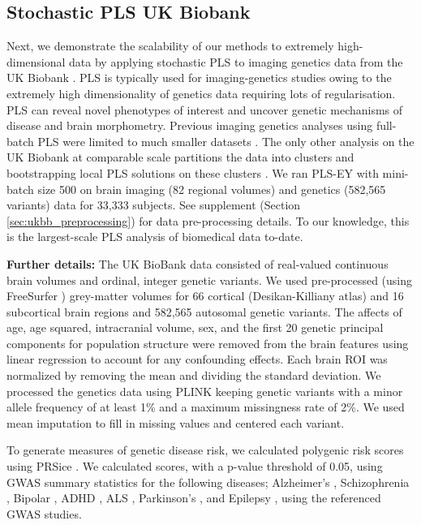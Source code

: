 \subsection{Stochastic PLS UK Biobank}
Next, we demonstrate the scalability of our methods to extremely high-dimensional data by applying stochastic PLS to imaging genetics data from the UK Biobank \citep{sudlow2015uk}.
PLS is typically used for imaging-genetics studies owing to the extremely high dimensionality of genetics data requiring lots of regularisation.
PLS can reveal novel phenotypes of interest and uncover genetic mechanisms of disease and brain morphometry.
Previous imaging genetics analyses using full-batch PLS were limited to much smaller datasets \citep{Lorenzi2018,Taquet2021,Lefloch2012}.
The only other analysis on the UK Biobank at comparable scale partitions the data into clusters and bootstrapping local PLS solutions on these clusters \citep{lorenzi2017secure, altmann2023tackling}.
We ran PLS-EY with mini-batch size 500 on brain imaging (82 regional volumes) and genetics (582,565 variants) data for 33,333 subjects. See supplement (Section \ref{sec:ukbb_preprocessing}) for data pre-processing details.
To our knowledge, this is the largest-scale PLS analysis of biomedical data to-date.

\textbf{Further details:} The UK BioBank data consisted of real-valued continuous brain volumes and ordinal, integer genetic variants. 
We used pre-processed (using FreeSurfer \citep{Fischl2012}) grey-matter volumes for 66 cortical (Desikan-Killiany atlas) and 16 subcortical brain regions and 582,565 autosomal genetic variants. 
The affects of age, age squared, intracranial volume, sex, and the first 20 genetic principal components for population structure were removed from the brain features using linear regression to account for any confounding effects. 
Each brain ROI was normalized by removing the mean and dividing the standard deviation. 
We processed the genetics data using PLINK \citep{Purcell2007} keeping genetic variants with a minor allele frequency of at least 1\%  and a maximum missingness rate of 2\%. 
We used mean imputation to fill in missing values and centered each variant. 

To generate measures of genetic disease risk, we calculated polygenic risk scores using PRSice \citep{PRSice2014}. We calculated scores, with a p-value threshold of 0.05, using GWAS summary statistics for the following diseases; Alzheimer's \citep{Lambert2013}, Schizophrenia \citep{Trubetskoy2022}, Bipolar \citep{Mullins2021}, ADHD \citep{Demontis2023}, ALS \citep{Van_Rheenen2021}, Parkinson's \citep{Nalls2019}, and Epilepsy \citep{International_League_Against_Epilepsy_Consortium_on_Complex_Epilepsies2018}, using the referenced GWAS studies.

